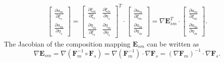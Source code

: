 \begin{align}
  \begin{bmatrix}
    \tfrac{\partial{u_m}}{\partial{\xi_s}} \\
    \tfrac{\partial{u_m}}{\partial{\eta_s}}
  \end{bmatrix}
  =
  \begin{bmatrix}
    \frac{\partial\xi_m}{\partial\xi_s}  & \frac{\partial\xi_m}{\partial\eta_s}  \\
    \frac{\partial\eta_m}{\partial\xi_s} & \frac{\partial\eta_m}{\partial\eta_s}
  \end{bmatrix}^T
  \cdot
  \begin{bmatrix}
    \tfrac{\partial{u_m}}{\partial{\xi_m}} \\
    \tfrac{\partial{u_m}}{\partial{\eta_m}}
  \end{bmatrix}
  =
  \nabla\mathbf{E}_{sm}^T
  \cdot
  \begin{bmatrix}
    \tfrac{\partial{u_m}}{\partial{\xi_m}} \\
    \tfrac{\partial{u_m}}{\partial{\eta_m}}
  \end{bmatrix}.
\end{align}
The Jacobian of the composition mapping $\mathbf{E}_{sm}$ can be written as
\begin{equation}
  \nabla\mathbf{E}_{sm}=\nabla(\mathbf{F}_{m}^{-1}\circ\mathbf{F}_{s})=\nabla(\mathbf{F}_{m}^{-1})\cdot{}\nabla\mathbf{F}_{s}=(\nabla\mathbf{F}_{m})^{-1}\cdot{}\nabla\mathbf{F}_{s}.
\end{equation}

